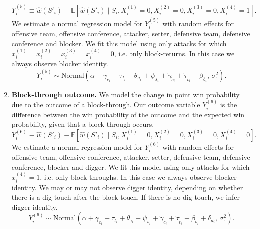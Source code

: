 \documentclass[USenglish]{article}
\theoremstyle{dgthm}
\theoremstyle{dgdef}
\begin{document}
\begin{enumerate}
        \begin{equation*}
            Y_i^{(5)} \equiv \hat w(S'_i) - \mathbb{E}\left[\hat w(S'_i) \mid S_i, X_i^{(1)} = 0, X_i^{(2)} = 0, X_i^{(3)} = 0, X_i^{(4)} = 1\right].
        \end{equation*}
        We estimate a normal regression model for $Y_i^{(5)}$ with random effects for offensive team, offensive conference, attacker, setter, defensive team, defensive conference and blocker. We fit this model using only attacks for which $x_i^{(1)} = x_i^{(2)} = x_i^{(3)} = x_i^{(4)} = 0$, i.e. only block-returns. In this case we always observe blocker identity.
        \begin{equation}
        \label{eqn:attack-model-5}
            Y_i^{(5)} \sim \mbox{Normal}\left(
                \alpha + \gamma_{c_i} + \tau_{t_i} + \theta_{a_i} + \psi_{s_i} + \tilde\gamma_{\tilde c_i} + \tilde\tau_{\tilde t_i} + \beta_{b_i},\,
                \sigma^2_\epsilon
            \right).
        \end{equation}
    \item
        {\bf Block-through outcome.} We model the change in point win probability due to the outcome of a block-through. Our outcome variable $Y_i^{(6)}$ is the difference between the win probability of the outcome and the expected win probability, given that a block-through occurs.
        \begin{equation*}
            Y_i^{(6)} \equiv \hat w(S'_i) - \mathbb{E}\left[\hat w(S'_i) \mid S_i, X_i^{(1)} = 0, X_i^{(2)} = 0, X_i^{(3)} = 0, X_i^{(4)} = 0\right].
        \end{equation*}
        We estimate a normal regression model for $Y_i^{(6)}$ with random effects for offensive team, offensive conference, attacker, setter, defensive team, defensive conference, blocker and digger. We fit this model using only attacks for which $x_i^{(4)} = 1$, i.e. only block-throughs. In this case we always observe blocker identity. We may or may not observe digger identity, depending on whether there is a dig touch after the block touch. If there is no dig touch, we infer digger identity.
        \begin{equation}
        \label{eqn:attack-model-6}
            Y_i^{(6)} \sim \mbox{Normal}\left(
                \alpha + \gamma_{c_i} + \tau_{t_i} + \theta_{a_i} + \psi_{s_i} + \tilde\gamma_{\tilde c_i} + \tilde\tau_{\tilde t_i} + \beta_{b_i} + \delta_{d_i},\,
                \sigma^2_\epsilon
            \right).
        \end{equation}

\end{enumerate}
\end{document}
